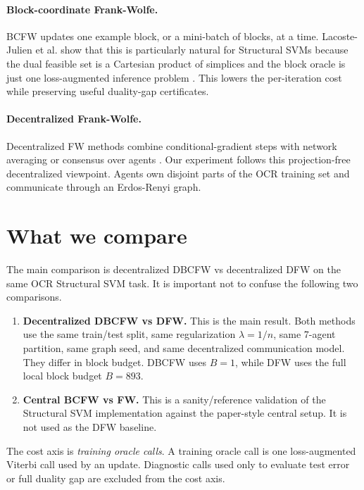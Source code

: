 \documentclass[11pt,a4paper]{article}
\begin{document}
\paragraph{Block-coordinate Frank-Wolfe.}
BCFW updates one example block, or a mini-batch of blocks, at a time. Lacoste-Julien et al. show that this is particularly natural for Structural SVMs because the dual feasible set is a Cartesian product of simplices and the block oracle is just one loss-augmented inference problem \citep{lacostejulien2013bcfw}. This lowers the per-iteration cost while preserving useful duality-gap certificates.

\paragraph{Decentralized Frank-Wolfe.}
Decentralized FW methods combine conditional-gradient steps with network averaging or consensus over agents \citep{wai2017decentralized}. Our experiment follows this projection-free decentralized viewpoint. Agents own disjoint parts of the OCR training set and communicate through an Erdos-Renyi graph.

\section{What we compare}

The main comparison is decentralized DBCFW vs decentralized DFW on the same OCR Structural SVM task. It is important not to confuse the following two comparisons.

\begin{enumerate}
  \item \textbf{Decentralized DBCFW vs DFW.} This is the main result. Both methods use the same train/test split, same regularization \(\lambda=1/n\), same 7-agent partition, same graph seed, and same decentralized communication model. They differ in block budget. DBCFW uses \(B=1\), while DFW uses the full local block budget \(B=893\).
  \item \textbf{Central BCFW vs FW.} This is a sanity/reference validation of the Structural SVM implementation against the paper-style central setup. It is not used as the DFW baseline.
\end{enumerate}

The cost axis is \emph{training oracle calls}. A training oracle call is one loss-augmented Viterbi call used by an update. Diagnostic calls used only to evaluate test error or full duality gap are excluded from the cost axis.
\end{document}
